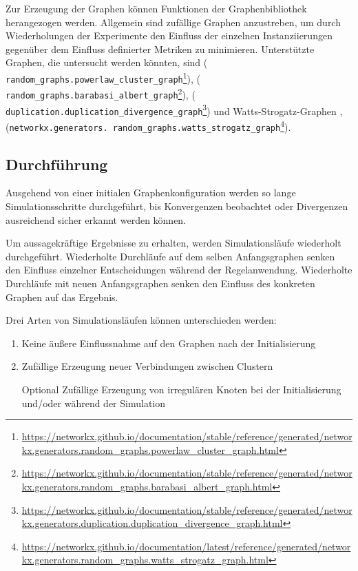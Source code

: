 \documentclass[11pt, a4paper]{scrartcl}
\newcommand{\nx}[1]{\texttt{#1}}
\begin{document}
Zur Erzeugung der Graphen können Funktionen der Graphenbibliothek \autocite{networkx} herangezogen werden. Allgemein sind zufällige Graphen anzustreben, um durch Wiederholungen der Experimente den Einfluss der einzelnen Instanziierungen gegenüber dem Einfluss definierter Metriken zu minimieren.
Unterstützte Graphen, die untersucht werden könnten, sind \autocite{Holme2002} (\nx{%
random\_graphs.powerlaw\_cluster\_graph}\footnote{\url{https://networkx.github.io/documentation/stable/reference/generated/networkx.generators.random_graphs.powerlaw_cluster_graph.html}}), \autocite{Barabasi509} (\nx{%
random\_graphs.barabasi\_albert\_graph}\footnote{\url{https://networkx.github.io/documentation/stable/reference/generated/networkx.generators.random_graphs.barabasi_albert_graph.html}}), \autocite{Ispolatov2005} (\nx{%
duplication.duplication\_divergence\_graph}\footnote{\url{https://networkx.github.io/documentation/stable/reference/generated/networkx.generators.duplication.duplication_divergence_graph.html}}) und Watts-Strogatz-Graphen \autocite{Watts1998}, \autocite{Newman1999} (\nx{networkx.generators.%
random\_graphs.watts\_strogatz\_graph}\footnote{\url{https://networkx.github.io/documentation/latest/reference/generated/networkx.generators.random_graphs.watts_strogatz_graph.html}}).

\subsection{Durchführung}
Ausgehend von einer initialen Graphenkonfiguration werden so lange Simulationsschritte durchgeführt, bis Konvergenzen beobachtet oder Divergenzen ausreichend sicher erkannt werden können.

Um aussagekräftige Ergebnisse zu erhalten, werden Simulationsläufe wiederholt durchgeführt. Wiederholte Durchläufe auf dem selben Anfangsgraphen senken den Einfluss einzelner Entscheidungen während der Regelanwendung. Wiederholte Durchläufe mit neuen Anfangsgraphen senken den Einfluss des konkreten Graphen auf das Ergebnis.

Drei Arten von Simulationsläufen können unterschieden werden:
\begin{enumerate}
\item Keine äußere Einflussnahme auf den Graphen nach der Initialisierung
\item Zufällige Erzeugung neuer Verbindungen zwischen Clustern
\item [Optional] Zufällige Erzeugung von irregulären Knoten bei der Initialisierung und/oder während der Simulation
\end{enumerate}
\end{document}
